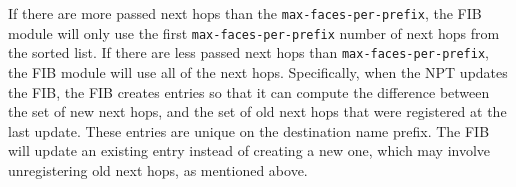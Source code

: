 If there are more passed next hops than the
\texttt{max-faces-per-prefix}, the FIB module will only use the first
\texttt{max-faces-per-prefix} number of next hops from the sorted
list.  If there are less passed next hops than
\texttt{max-faces-per-prefix}, the FIB module will use all of the next hops.
Specifically, when the NPT updates the FIB, the FIB creates entries so
that it can compute the difference between the set of new next hops,
and the set of old next hops that were registered at the last update.
These entries are unique on the destination name prefix. The FIB will
update an existing entry instead of creating a new one, which may
involve unregistering old next hops, as mentioned above.
